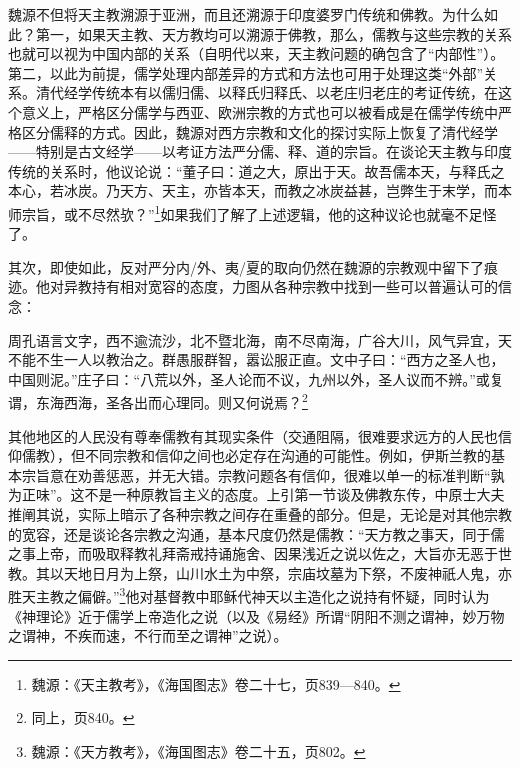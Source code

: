 \documentclass[a4paper, 12pt, openright]{ctexbook}
\renewenvironment{quote}
  {\list{}{\rightmargin2\ccwd \leftmargin2\ccwd \itemindent=2\ccwd \listparindent=2\ccwd}%
   \item\relax\small\kaishu\color{black}}
  {\endlist}
\begin{document}
魏源不但将天主教溯源于亚洲，而且还溯源于印度婆罗门传统和佛教。为什么如此？第一，如果天主教、天方教均可以溯源于佛教，那么，儒教与这些宗教的关系也就可以视为中国内部的关系（自明代以来，天主教问题的确包含了“内部性”）。第二，以此为前提，儒学处理内部差异的方式和方法也可用于处理这类“外部”关系。清代经学传统本有以儒归儒、以释氏归释氏、以老庄归老庄的考证传统，在这个意义上，严格区分儒学与西亚、欧洲宗教的方式也可以被看成是在儒学传统中严格区分儒释的方式。因此，魏源对西方宗教和文化的探讨实际上恢复了清代经学——特别是古文经学——以考证方法严分儒、释、道的宗旨。在谈论天主教与印度传统的关系时，他议论说：“董子曰：道之大，原出于天。故吾儒本天，与释氏之本心，若冰炭。乃天方、天主，亦皆本天，而教之冰炭益甚，岂弊生于末学，而本师宗旨，或不尽然欤？”\footnote{魏源：《天主教考》，《海国图志》卷二十七，页839—840。}如果我们了解了上述逻辑，他的这种议论也就毫不足怪了。

其次，即使如此，反对严分内/外、夷/夏的取向仍然在魏源的宗教观中留下了痕迹。他对异教持有相对宽容的态度，力图从各种宗教中找到一些可以普遍认可的信念：

\begin{quote}
周孔语言文字，西不逾流沙，北不暨北海，南不尽南海，广谷大川，风气异宜，天不能不生一人以教治之。群愚服群智，嚣讼服正直。文中子曰：“西方之圣人也，中国则泥。”庄子曰：“八荒以外，圣人论而不议，九州以外，圣人议而不辨。”或复谓，东海西海，圣各出而心理同。则又何说焉？\footnote{同上，页840。}
\end{quote}

其他地区的人民没有尊奉儒教有其现实条件（交通阻隔，很难要求远方的人民也信仰儒教），但不同宗教和信仰之间也必定存在沟通的可能性。例如，伊斯兰教的基本宗旨意在劝善惩恶，并无大错。宗教问题各有信仰，很难以单一的标准判断“孰为正味”。这不是一种原教旨主义的态度。上引第一节谈及佛教东传，中原士大夫推阐其说，实际上暗示了各种宗教之间存在重叠的部分。但是，无论是对其他宗教的宽容，还是谈论各宗教之沟通，基本尺度仍然是儒教：“天方教之事天，同于儒之事上帝，而吸取释教礼拜斋戒持诵施舍、因果浅近之说以佐之，大旨亦无恶于世教。其以天地日月为上祭，山川水土为中祭，宗庙坟墓为下祭，不废神祇人鬼，亦胜天主教之偏僻。”\footnote{魏源：《天方教考》，《海国图志》卷二十五，页802。}他对基督教中耶稣代神天以主造化之说持有怀疑，同时认为《神理论》近于儒学上帝造化之说（以及《易经》所谓“阴阳不测之谓神，妙万物之谓神，不疾而速，不行而至之谓神”之说）。
\end{document}
